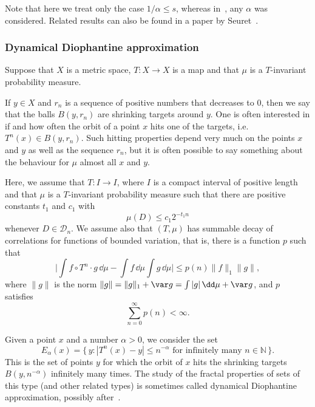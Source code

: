 Note that here we treat only the case $1/\alpha \leq s$, whereas in~\cite{ekstrompersson}, any $\alpha$ was considered. Related results can also be found in a paper by Seuret~\cite{seuret}.

\subsubsection{Dynamical Diophantine approximation} \label{sec:shrinking}

Suppose that $X$ is a metric space, $T \colon X \to X$ is a map and that $\mu$ is a $T$-invariant probability measure.

If $y \in X$ and $r_n$ is a sequence of positive numbers that decreases to 0, then we say that the balls $B(y, r_n)$ are shrinking targets around $y$. One is often interested in if and how often the orbit of a point $x$ hits one of the targets, i.e.\ $T^n (x) \in B (y, r_n)$. Such hitting properties depend very much on the points $x$ and $y$ as well as the sequence $r_n$, but it is often possible to say something about the behaviour for $\mu$ almost all $x$ and $y$.

Here, we assume that $T \colon I \to I$, where $I$ is a compact interval of positive length and that $\mu$ is a $T$-invariant probability measure such that there are positive constants $t_1$ and $c_1$ with
\begin{equation}\label{eq:measuredecay}
\mu (D) \leq c_1 2^{-t_1 n}
\end{equation}
whenever $D \in \mathscr{D}_n$. We assume also that $(T,\mu)$ has summable decay of correlations for functions of bounded variation, that is, there is a function $p$ such that
\begin{equation}\label{eq:decay}
\biggl| \int f \circ T^n \cdot g \, \dd \mu - \int f \,
\dd \mu \int g \, \dd\mu \biggr| \leq p(n) \lVert f
\rVert_1 \lVert g \rVert,
\end{equation}
where $\lVert g \rVert$ is the norm $\lVert g \rVert = \lVert g
\rVert_1 + \var g = \int |g| \, \dd \mu + \var g$, and $p$ satisfies
\[
\sum_{n=0}^\infty p(n) < \infty.
\]

Given a point $x$ and a number $\alpha > 0$, we consider the set
\[
E_\alpha (x) = \{\, y : |T^n (x) - y| \leq n^{-\alpha} \text{ for infinitely many } n \in \mathbb{N} \,\}.
\]
This is the set of points $y$ for which the orbit of $x$ hits the shrinking targets $B(y,n^{-\alpha})$ infinitely many times. The study of the fractal properties of sets of this type (and other related types) is sometimes called dynamical Diophantine approximation, possibly after~\cite{fanschmelingtroubetzkoy}.

